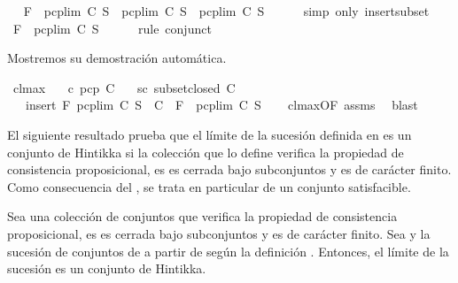\begin{isabellebody}
\ \isamarkupfalse%
\ {\isachardoublequoteopen}F\ {\isasymin}\ pcp{\isacharunderscore}lim\ C\ S\ {\isasymand}\ pcp{\isacharunderscore}lim\ C\ S\ {\isasymsubseteq}\ pcp{\isacharunderscore}lim\ C\ S{\isachardoublequoteclose}\isanewline
\ \ \ \ \isamarkupfalse%
\ {\isacharparenleft}simp\ only{\isacharcolon}\ insert{\isacharunderscore}subset{\isacharparenright}\isanewline
\ \ \isamarkupfalse%
\ {\isachardoublequoteopen}F\ {\isasymin}\ pcp{\isacharunderscore}lim\ C\ S{\isachardoublequoteclose}\isanewline
\ \ \ \ \isamarkupfalse%
\ {\isacharparenleft}rule\ conjunct{}{\isacharparenright}\isanewline
{}\isamarkupfalse%
%
\endisatagproof
{\isafoldproof}%
%
\isadelimproof
%
\endisadelimproof
%
\begin{isamarkuptext}%
Mostremos su demostración automática.%
\end{isamarkuptext}\isamarkuptrue%
\isamarkupfalse%
\ cl{\isacharunderscore}max{\isacharprime}{\isacharcolon}\isanewline
\ \ \ c{\isacharcolon}\ {\isachardoublequoteopen}pcp\ C{\isachardoublequoteclose}\isanewline
\ \ \ sc{\isacharcolon}\ {\isachardoublequoteopen}subset{\isacharunderscore}closed\ C{\isachardoublequoteclose}\isanewline
\ \ \ {\isachardoublequoteopen}insert\ F\ {\isacharparenleft}pcp{\isacharunderscore}lim\ C\ S{\isacharparenright}\ {\isasymin}\ C\ {\isasymLongrightarrow}\ F\ {\isasymin}\ pcp{\isacharunderscore}lim\ C\ S{\isachardoublequoteclose}\isanewline
%
\isadelimproof
\ \ %
\endisadelimproof
%
\isatagproof
{}\isamarkupfalse%
\ cl{\isacharunderscore}max{\isacharbrackleft}OF\ assms{\isacharbrackright}\ \isamarkupfalse%
\ blast{\isacharplus}%
\endisatagproof
{\isafoldproof}%
%
\isadelimproof
%
\endisadelimproof
%
\begin{isamarkuptext}%
El siguiente resultado prueba que el límite de la sucesión definida en  es un conjunto
  de Hintikka si la colección que lo define verifica la propiedad de consistencia proposicional, es
  es cerrada bajo subconjuntos y es de carácter finito. Como consecuencia del ,
  se trata en particular de un conjunto satisfacible. 

  \begin{lema}
    Sea  una colección de conjuntos que verifica la propiedad de consistencia proposicional, es
    es cerrada bajo subconjuntos y es de carácter finito. Sea  y  la sucesión de
    conjuntos de  a partir de  según la definición . Entonces, el límite de la sucesión
     es un conjunto de Hintikka.
  \end{lema}


\end{isamarkuptext}
\end{isabellebody}
